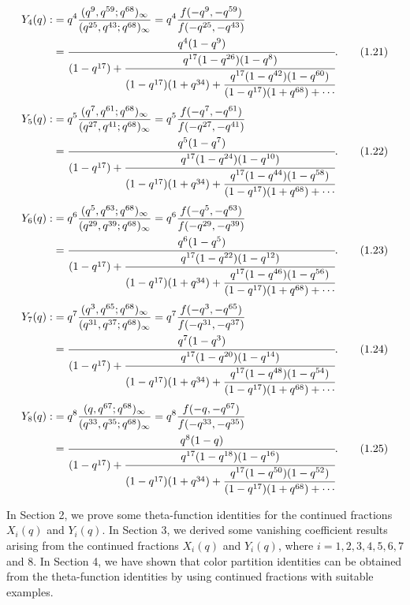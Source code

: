 \documentclass[11pt,a4paper]{article}
\numberwithin{equation}{section}
\theoremstyle{plain}
\begin{document}
	\begin{align}
		Y_4(q) :&= q^{4}\frac{(q^{9},q^{59};q^{68})_{\infty}}{(q^{25},q^{43};q^{68})_{\infty}}
		= q^{4}\frac{f(-q^{9},-q^{59})}{f(-q^{25},-q^{43})}  \notag\\
		&=
		\cfrac{q^{4}(1-q^{9})}
		{(1-q^{17})
			+\cfrac{q^{17}(1-q^{26})(1-q^{8})}
			{(1-q^{17})(1+q^{34})
				+\cfrac{q^{17}(1-q^{42})(1-q^{60})}
				{(1-q^{17})(1+q^{68})+\cdots}}}.
		\tag{1.21}
	\end{align}
	\begin{align}
		Y_5(q) :&= q^{5}\frac{(q^{7},q^{61};q^{68})_{\infty}}{(q^{27},q^{41};q^{68})_{\infty}}
		= q^{5}\frac{f(-q^{7},-q^{61})}{f(-q^{27},-q^{41})}  \notag\\
		&=
		\cfrac{q^{5}(1-q^{7})}
		{(1-q^{17})
			+\cfrac{q^{17}(1-q^{24})(1-q^{10})}
			{(1-q^{17})(1+q^{34})
				+\cfrac{q^{17}(1-q^{44})(1-q^{58})}
				{(1-q^{17})(1+q^{68})+\cdots}}}.
		\tag{1.22}
	\end{align}
	\begin{align}
		Y_6(q) :&= q^{6}\frac{(q^{5},q^{63};q^{68})_{\infty}}{(q^{29},q^{39};q^{68})_{\infty}}
		= q^{6}\frac{f(-q^{5},-q^{63})}{f(-q^{29},-q^{39})}  \notag\\
		&=
		\cfrac{q^{6}(1-q^{5})}
		{(1-q^{17})
			+\cfrac{q^{17}(1-q^{22})(1-q^{12})}
			{(1-q^{17})(1+q^{34})
				+\cfrac{q^{17}(1-q^{46})(1-q^{56})}
				{(1-q^{17})(1+q^{68})+\cdots}}}.
		\tag{1.23}
	\end{align}
	\begin{align}
		Y_7(q) :&= q^{7}\frac{(q^{3},q^{65};q^{68})_{\infty}}{(q^{31},q^{37};q^{68})_{\infty}}
		= q^{7}\frac{f(-q^{3},-q^{65})}{f(-q^{31},-q^{37})}  \notag\\
		&=
		\cfrac{q^{7}(1-q^{3})}
		{(1-q^{17})
			+\cfrac{q^{17}(1-q^{20})(1-q^{14})}
			{(1-q^{17})(1+q^{34})
				+\cfrac{q^{17}(1-q^{48})(1-q^{54})}
				{(1-q^{17})(1+q^{68})+\cdots}}}.
		\tag{1.24}
	\end{align}
	\begin{align}
		Y_8(q) :&= q^{8}\frac{(q,q^{67};q^{68})_{\infty}}{(q^{33},q^{35};q^{68})_{\infty}}
		= q^{8}\frac{f(-q,-q^{67})}{f(-q^{33},-q^{35})}  \notag\\
		&=
		\cfrac{q^{8}(1-q)}
		{(1-q^{17})
			+\cfrac{q^{17}(1-q^{18})(1-q^{16})}
			{(1-q^{17})(1+q^{34})
				+\cfrac{q^{17}(1-q^{50})(1-q^{52})}
				{(1-q^{17})(1+q^{68})+\cdots}}}.
		\tag{1.25}
	\end{align}
	
	
	In Section 2, we prove some theta-function identities for the continued fractions $X_i(q)$ and $Y_i(q)$.
	In Section 3, we derived some vanishing coefficient results arising from the continued fractions $X_i(q)$ and $Y_i(q)$, where $i=1,2,3,4,5,6,7$ and $8.$
    In Section 4, we have shown that color partition identities can be obtained from the theta-function identities by using continued fractions with suitable examples.
	
\end{document}
